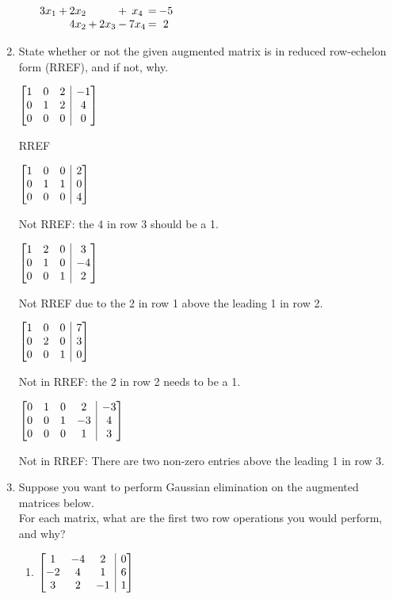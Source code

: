 \documentclass[12pt]{article}
\makeatletter
\newenvironment{amatrix}[1]{%
  \left[\begin{array}{@{}*{#1}{c}|c@{}}
}{%
  \end{array}\right]
}
\newcommand{\bam}{\begin{amatrix}}
\newcommand{\eam}{\end{amatrix}}
\makeatother
\begin{document}
\begin{enumerate}
\begin{multicols}{2}
\begin{enumerate}
\medskip

 $\arraycolsep1pt\begin{array}{ccccccccc}
 3x_1&+&2x_2& & &+&x_4&=&-5\\ & &4x_2&+&2x_3&-&7x_4&=&2\end{array}$
\end{enumerate}
\end{multicols}

\bigskip

\item State whether or not the given augmented matrix is in reduced row-echelon form (RREF), and if not, why.
\begin{multicols}{5}
$\bam{3}1&0&2&-1\\0&1&2&4\\0&0&0&0\eam$

RREF\columnbreak

$\bam{3}1&0&0&2\\0&1&1&0\\0&0&0&4\eam$

Not RREF: the 4 in row 3 should be a 1.\columnbreak

$\bam{3}1&2&0&3\\0&1&0&-4\\0&0&1&2\eam$

Not RREF due to the 2 in row 1 above the leading 1 in row 2.\columnbreak

$\bam{3}1&0&0&7\\0&2&0&3\\0&0&1&0\eam$

Not in RREF: the 2 in row 2 needs to be a 1.\columnbreak

$\bam{4}0&1&0&2&-3\\0&0&1&-3&4\\0&0&0&1&3\eam$

Not in RREF: There are two non-zero entries above the leading 1 in row 3.
\end{multicols}

\pagebreak

\item Suppose you want to perform Gaussian elimination on the augmented matrices below. \\For each matrix, what are the first two row operations you would perform, and why?

\begin{enumerate}
\item $\bam{3} 1&-4&2&0\\-2&4&1&6\\3&2&-1&1\eam$


\end{enumerate}
\end{enumerate}
\end{document}
